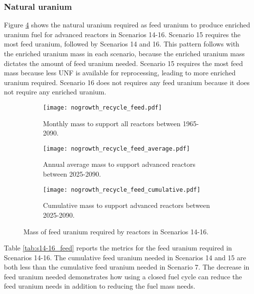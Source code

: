 \subsubsection{Natural uranium}
Figure \ref{fig:nogrowth_recycle_feed} shows 
the natural uranium required as feed uranium to produce enriched 
uranium fuel for advanced reactors in Scenarios 14-16.  
Scenario 15 requires 
the most feed uranium, followed by Scenarios 14 and 16. This pattern follows 
with the enriched uranium mass in each scenario, because the enriched 
uranium mass dictates the amount of feed uranium needed.
Scenario 15 requires the 
most feed mass because less \gls{UNF} is available for reprocessing, 
leading to more 
enriched uranium required. Scenario 
16 does not requires any feed uranium because it does not require any 
enriched uranium. 

\begin{figure}[h!]
    \centering
    \begin{subfigure}[b]{0.45\textwidth}
        \centering
        \texttt{[image: nogrowth\_recycle\_feed.pdf]}
        \caption{Monthly mass 
        to support all reactors between 1965-2090.}
        \label{fig:nogrowth_recycle_all_feed}
    \end{subfigure}
    \hfill
    \begin{subfigure}[b]{0.45\textwidth}
        \centering
        \texttt{[image: nogrowth\_recycle\_feed\_average.pdf]}
        \caption{Annual average  mass 
        to support advanced reactors between 2025-2090.}
        \label{fig:nogrowth_recycle_AR_feed}
    \end{subfigure}
    \begin{subfigure}[b]{0.45\textwidth}
        \centering
        \texttt{[image: nogrowth\_recycle\_feed\_cumulative.pdf]}
        \caption{Cumulative mass to support advanced reactors between 2025-2090.}
        \label{fig:nogrowth_recycle_feed_cumulative}
    \end{subfigure}
       \caption{Mass of feed uranium required by reactors
        in Scenarios 14-16.}
       \label{fig:nogrowth_recycle_feed}
\end{figure}

Table \ref{tab:s14-16_feed} reports the metrics for the feed uranium 
required in Scenarios 14-16. The cumulative feed uranium needed in 
Scenarios 14 and 15 are both less than the cumulative feed uranium 
needed in Scenario 7. The decrease in feed uranium needed demonstrates 
how using a closed fuel cycle can reduce the feed uranium needs in 
addition to reducing the fuel mass needs. 

